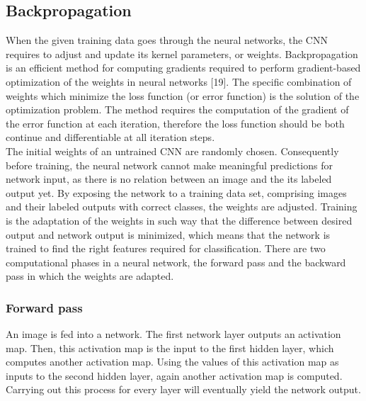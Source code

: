     \subsection{Backpropagation}
    When the given training data goes through the neural networks, the CNN requires to adjust and update its kernel parameters, or weights. Backpropagation\cite{werbos1990backpropagation} is an efficient method for computing gradients required to perform gradient-based optimization of the weights in neural networks [19]. The specific combination of weights which minimize the loss function (or error function) is the solution of the optimization problem. The method requires the computation of the gradient of the error function at each iteration, therefore the loss function should be both continue and differentiable at all iteration steps.\\

    The initial weights of an untrained CNN are randomly chosen. Consequently before training, the neural network cannot make meaningful predictions for network input, as there is no relation between an image and the its labeled output yet. By exposing the network to a training data set, comprising images and their labeled outputs with correct classes, the weights are adjusted. Training is the adaptation of the weights in such way that the difference between desired output and network output is minimized, which means that the network is trained to find the right features required for classification. There are two computational phases in a neural network, the forward pass and the backward pass in which the weights are adapted.

    \subsubsection{Forward pass}
    An image is fed into a network. The first network layer outputs an activation map. Then, this activation map is the input to the first hidden layer, which computes another activation map. Using the values of this activation map as inputs to the second hidden layer, again another activation map is computed. Carrying out this process for every layer will eventually yield the network output.

